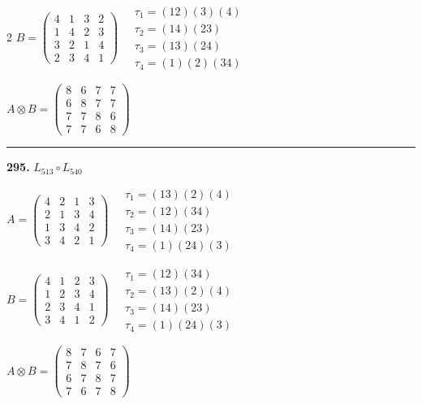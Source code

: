 \begin{multicols}{2}
$B = \begin{pmatrix} 4 & 1 & 3 & 2 \\ 1 & 4 & 2 & 3 \\ 3 & 2 & 1 & 4 \\ 2 & 3 & 4 & 1 \end{pmatrix} \quad \begin{matrix} \tau_{1}=(1 2)(3)(4) \\ \tau_{2}=(1 4)(2 3) \\ \tau_{3}=(1 3)(2 4) \\ \tau_{4}=(1)(2)(3 4) \end{matrix}$

$A \otimes B = \begin{pmatrix} 8 & 6 & 7 & 7 \\ 6 & 8 & 7 & 7 \\ 7 & 7 & 8 & 6 \\ 7 & 7 & 6 & 8 \end{pmatrix}$

\vspace{0.3em}
\hrule
\vspace{0.3em}

\noindent\textbf{295.} $L_{513} \circ L_{540}$

$A = \begin{pmatrix} 4 & 2 & 1 & 3 \\ 2 & 1 & 3 & 4 \\ 1 & 3 & 4 & 2 \\ 3 & 4 & 2 & 1 \end{pmatrix} \quad \begin{matrix} \tau_{1}=(1 3)(2)(4) \\ \tau_{2}=(1 2)(3 4) \\ \tau_{3}=(1 4)(2 3) \\ \tau_{4}=(1)(2 4)(3) \end{matrix}$

$B = \begin{pmatrix} 4 & 1 & 2 & 3 \\ 1 & 2 & 3 & 4 \\ 2 & 3 & 4 & 1 \\ 3 & 4 & 1 & 2 \end{pmatrix} \quad \begin{matrix} \tau_{1}=(1 2)(3 4) \\ \tau_{2}=(1 3)(2)(4) \\ \tau_{3}=(1 4)(2 3) \\ \tau_{4}=(1)(2 4)(3) \end{matrix}$

$A \otimes B = \begin{pmatrix} 8 & 7 & 6 & 7 \\ 7 & 8 & 7 & 6 \\ 6 & 7 & 8 & 7 \\ 7 & 6 & 7 & 8 \end{pmatrix}$


\end{multicols}
